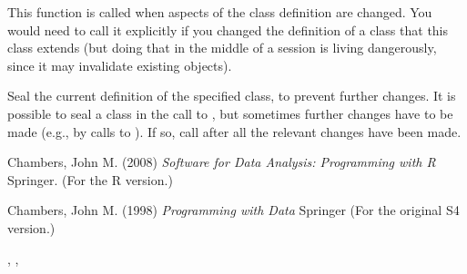 \begin{Details}
\begin{description}
This function is called when aspects of the class definition are
changed.  You would need to call it explicitly if you changed the
definition of a class that this class extends (but doing that in
the  middle of a session is living dangerously, since it may
invalidate existing objects).

\item[\code{sealClass}:]  Seal the current definition of the specified
class, to prevent further changes.  It is possible to seal a class
in the call to , but sometimes further changes have
to be made (e.g., by calls to ).  If so, call
 after all the relevant changes have been made.


\end{description}

\end{Details}
%
\begin{References}\relax
Chambers, John M. (2008)
\emph{Software for Data Analysis: Programming with R}
Springer.  (For the R version.)

Chambers, John M. (1998)
\emph{Programming with Data}
Springer (For the original S4 version.)
\end{References}
%
\begin{SeeAlso}\relax
{},
,
\end{SeeAlso}
%
